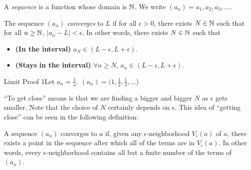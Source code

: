\begin{definition}
    A \textit{sequence} is a function whose domain is \(\mathbb{N}\). We write \((a_n) = a_1,a_2,a_3,\dots\).
\end{definition}
\setcounter{BoxCounter}{2}
\begin{definition}
    The sequence \((a_n)\) \textit{converges} to \(L\) if for all \(\epsilon > 0\), there exists \(N \in \mathbb{N}\) such that for all \(n \geq \mathbb{N}\), \(|a_n - L| < \epsilon\). In other words, there exists \(N \in \mathbb{N}\) such that
    \begin{itemize}
        \item \textbf{(In the interval)} \(a_N \in (L - \epsilon, L + \epsilon)\).
        \item \textbf{(Stays in the interval)} \(\forall n \geq N\), \(a_n \in (L - \epsilon, L + \epsilon)\).
    \end{itemize}
\end{definition}

\begin{example}
    {Limit Proof 1}Let \(a_n = \frac{1}{n}\). \((a_n) = (1,\frac{1}{2},\frac{1}{3},\dots\))
\end{example}


``To get close'' means is that we are finding a bigger and bigger \(N\) as \(\epsilon\) gets smaller. Note that the choice of \(N\) certainly depends on \(\epsilon\). This idea of ``getting close'' can be seen in the following definition:

\begin{tcolorbox}%
    [enhanced, sharp corners=downhill, colframe=xred, colback=xred!15, coltitle=white, label=def:2.2.3B, title={\large \textbf{Definition 2.2.3B}},attach boxed title to top right={xshift=-0.5cm}, boxed title style={colback=xred}]
    A sequence \( (a_n) \) converges to \( a \) if, given any \( \epsilon \)-neighborhood \( V_\epsilon(a) \) of \( a \), there exists a point in the sequence after which all of the terms are in \( V_\epsilon(a) \). In other words, every \( \epsilon \)-neighborhood contains all but a finite number of the terms of \( (a_n) \).
\end{tcolorbox}

